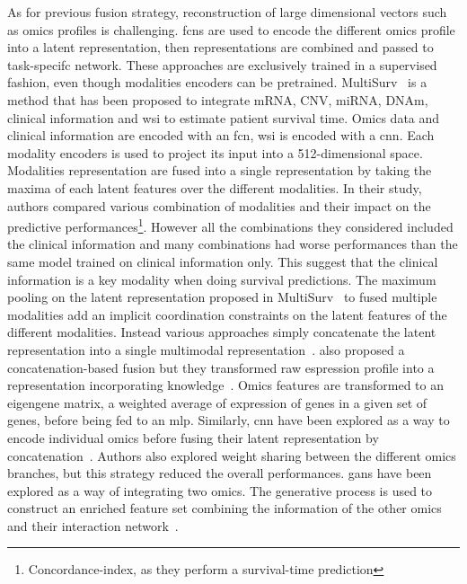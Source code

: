 \documentclass[../main.tex]{subfiles}
\begin{document}
		As for previous fusion strategy, reconstruction of large dimensional vectors such as omics profiles is challenging.
		\Glspl{fcn} are used to encode the different omics profile into a latent representation, then representations are combined and passed to task-specifc network.
		These approaches are exclusively trained in a supervised fashion, even though modalities encoders can be pretrained.
		MultiSurv~\cite{MultiSurv} is a method that has been proposed to integrate mRNA, CNV, miRNA, DNAm, clinical information and \gls{wsi} to estimate patient survival time.
		Omics data and clinical information are encoded with an \gls{fcn}, \gls{wsi} is encoded with a \gls{cnn}.
		Each modality encoders is used to project its input into a 512-dimensional space.
		Modalities representation are fused into a single representation by taking the maxima of each latent features over the different modalities.
		In their study, authors compared various combination of modalities and their impact on the predictive performances\footnote{Concordance-index, as they perform a survival-time prediction}.
		However all the combinations they considered included the clinical information and many combinations had worse performances than the same model trained on clinical information only.
		This suggest that the clinical information is a key modality when doing survival predictions.
		The maximum pooling on the latent representation proposed in MultiSurv~\cite{MultiSurv} to fused multiple modalities add an implicit coordination constraints on the latent features of the different modalities.
		Instead various approaches simply concatenate the latent representation into a single multimodal representation~\cite{MOLI,Lin2020}.
		\citeauthor{SALMON} also proposed a concatenation-based fusion but they transformed raw espression profile into a representation incorporating knowledge~\cite{SALMON}.
		Omics features are transformed to an eigengene matrix, a weighted average of expression of genes in a given set of genes, before being fed to an \gls{mlp}.
		Similarly, \gls{cnn} have been explored as a way to encode individual omics before fusing their latent representation by concatenation~\cite{MohaiminulIslam2020}.
		Authors also explored weight sharing between the different omics branches, but this strategy reduced the overall performances.
		\Glspl{gan} have been explored as a way of integrating two omics.
		The generative process is used to construct an enriched feature set combining the information of the other omics and their interaction network~\cite{omicsGAN}.
\end{document}
